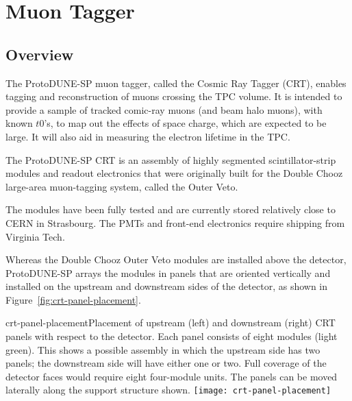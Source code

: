 

\section{Muon Tagger}
\label{sec:beam:muontagger}

\subsection{Overview}

The ProtoDUNE-SP muon tagger, called the Cosmic Ray Tagger (CRT), enables tagging and reconstruction of muons crossing the TPC volume. It is intended to provide a sample of tracked comic-ray muons (and beam halo muons), with known $t0$'s, to map out the effects of space charge, which are expected to be large. It will also aid in measuring the electron lifetime in the TPC.

The ProtoDUNE-SP CRT is an assembly of highly segmented scintillator-strip modules and readout electronics that were originally built for the Double Chooz large-area muon-tagging system, called the Outer Veto.  
 
The modules have been fully tested %
and are currently stored relatively close to CERN in Strasbourg. The PMTs and front-end electronics %
require shipping from %
Virginia Tech.

Whereas the Double Chooz Outer Veto modules are installed above the detector, ProtoDUNE-SP arrays the modules in panels that are oriented vertically and installed on the upstream and downstream sides of the detector, as shown in Figure~\ref{fig:crt-panel-placement}. 

\begin{cdrfigure}{crt-panel-placement}{Placement of upstream (left) and downstream (right) CRT panels with respect to the detector. Each panel consists of eight modules  (light green). This shows a possible assembly in which the  upstream side has two panels; the downstream side will have either one or two. Full coverage of the detector faces would require eight four-module units. The panels can be moved laterally along the support structure shown.}
  \texttt{[image: crt-panel-placement]}
\end{cdrfigure}


